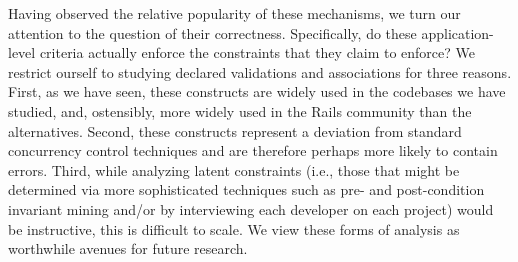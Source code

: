 Having observed the relative popularity of these mechanisms, we turn
our attention to the question of their correctness. Specifically, do
these application-level criteria actually enforce the constraints that
they claim to enforce? We restrict ourself to studying declared
validations and associations for three reasons. First, as we have
seen, these constructs are widely used in the codebases we have
studied, and, ostensibly, more widely used in the Rails community than
the alternatives. Second, these constructs represent a deviation from
standard concurrency control techniques and are therefore perhaps more
likely to contain errors. Third, while analyzing latent constraints (i.e.,
those that might be determined via more sophisticated techniques such
as pre- and post-condition invariant mining and/or by interviewing each
developer on each project) would be instructive, this is difficult to
scale. We view these forms of analysis as worthwhile avenues for
future research.
